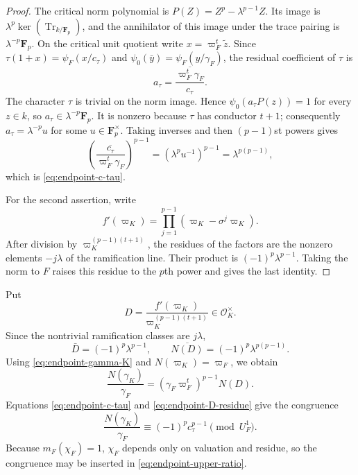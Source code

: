 \documentclass[11pt]{amsart}
\theoremstyle{definition}
\theoremstyle{remark}
\newcommand{\F}{\mathbf F}
\newcommand{\cO}{\mathcal O}
\newcommand{\Tr}{\operatorname{Tr}}
\begin{document}
\begin{proof}
The critical norm polynomial is
$P(Z)=Z^p-\lambda^{p-1}Z$.  Its image is
$\lambda^p\ker(\Tr_{k/\F_p})$, and the annihilator of this image
under the trace pairing is $\lambda^{-p}\F_p$.  On the critical
unit quotient write $x=\varpi_F^t\widetilde z$.  Since
$\tau(1+x)=\psi_F(x/c_\tau)$ and
$\psi_0(\bar y)=\psi_F(y/\gamma_F)$, the residual coefficient of
$\tau$ is
\[
 a_\tau=
 \overline{\frac{\varpi_F^t\gamma_F}{c_\tau}}.
\]
The character $\tau$ is trivial on the norm image.  Hence
$\psi_0(a_\tau P(z))=1$ for every $z\in k$, so
$a_\tau\in\lambda^{-p}\F_p$.  It is nonzero because $\tau$ has
conductor $t+1$; consequently
$a_\tau=\lambda^{-p}u$ for some $u\in\F_p^\times$.  Taking
inverses and then $(p-1)$st powers gives
\[
 \left(\overline{\frac{c_\tau}
 {\varpi_F^t\gamma_F}}\right)^{p-1}
 =(\lambda^p u^{-1})^{p-1}
 =\lambda^{p(p-1)},
\]
which is \eqref{eq:endpoint-c-tau}.

For the second assertion, write
\[
 f'(\varpi_K)=\prod_{j=1}^{p-1}
 (\varpi_K-\sigma^j\varpi_K).
\]
After division by $\varpi_K^{(p-1)(t+1)}$, the residues of the factors
are the nonzero elements $-j\lambda$ of the ramification line.
Their product is $(-1)^p\lambda^{p-1}$.  Taking the norm to $F$ raises
this residue to the $p$th power and gives the last identity.
\end{proof}

Put
\[
 D=\frac{f'(\varpi_K)}{\varpi_K^{(p-1)(t+1)}}\in\cO_K^\times.
\]
Since the nontrivial ramification classes are $j\lambda$,
\begin{equation}\label{eq:endpoint-D-residue}
 \bar D=(-1)^p\lambda^{p-1},
 \qquad
 \overline{N(D)}=(-1)^p\lambda^{p(p-1)}.
\end{equation}
Using \eqref{eq:endpoint-gamma-K} and $N(\varpi_K)=\varpi_F$, we obtain
\[
 \frac{N(\gamma_K)}{\gamma_F}
   =(\gamma_F\varpi_F^t)^{p-1}N(D).
\]
Equations \eqref{eq:endpoint-c-tau} and
\eqref{eq:endpoint-D-residue} give the congruence
\begin{equation}\label{eq:endpoint-discriminant-congruence}
 \frac{N(\gamma_K)}{\gamma_F}
 \equiv(-1)^p c_\tau^{p-1}\pmod{U_F^1}.
\end{equation}
Because $m_F(\chi_F)=1$, $\chi_F$ depends only on valuation and residue,
so the congruence may be inserted in \eqref{eq:endpoint-upper-ratio}.
\end{document}
